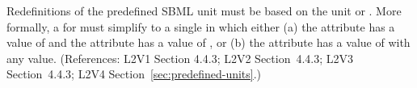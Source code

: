 Redefinitions of the predefined SBML unit  must be based on the unit
 or .  More formally, a \UnitDefinition
for  must simplify to a single \Unit in which either (a) the
 attribute has a value of  and the
 attribute has a value of , or (b) the
 attribute has a value of  with
any  value.  (References: L2V1 Section 4.4.3; L2V2
Section~4.4.3; L2V3 Section~4.4.3; L2V4 Section~\ref{sec:predefined-units}.)
